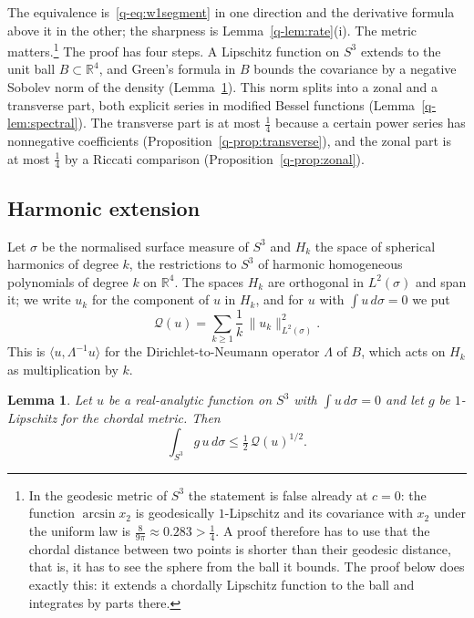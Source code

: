 \documentclass[11pt]{amsart}
\newtheorem{lemma}[theorem]{Lemma}
\theoremstyle{definition}
\theoremstyle{remark}
\numberwithin{equation}{section}
\newcommand{\R}{\mathbb{R}}
\newcommand{\ip}[2]{\langle #1,#2\rangle}
\begin{document}
The equivalence is~\eqref{q-eq:w1segment} in one direction and the derivative
formula above it in the other; the sharpness is Lemma~\ref{q-lem:rate}(i). The
metric matters.\footnote{In the geodesic metric of $S^3$ the statement is
false already at $c=0$: the function $\arcsin x_2$ is geodesically
$1$-Lipschitz and its covariance with $x_2$ under the uniform law is
$\frac8{9\pi}\approx0.283>\frac14$. A proof therefore has to use that the
chordal distance between two points is shorter than their geodesic distance,
that is, it has to see the sphere from the ball it bounds. The proof below
does exactly this: it extends a chordally Lipschitz function to the ball and
integrates by parts there.} The proof has four steps. A Lipschitz function
on $S^3$ extends to the unit ball $B\subset\R^4$, and Green's formula in $B$
bounds the covariance by a negative Sobolev norm of the density
(Lemma~\ref{q-lem:harmonic}). This norm splits into a zonal and a transverse
part, both explicit series in modified Bessel functions
(Lemma~\ref{q-lem:spectral}). The transverse part is at most $\frac14$ because a
certain power series has nonnegative coefficients
(Proposition~\ref{q-prop:transverse}), and the zonal part is at most $\frac14$
by a Riccati comparison (Proposition~\ref{q-prop:zonal}).

\subsection{Harmonic extension}

Let $\sigma$ be the normalised surface measure of $S^3$ and $H_k$ the space
of spherical harmonics of degree $k$, the restrictions to $S^3$ of harmonic
homogeneous polynomials of degree $k$ on $\R^4$. The spaces $H_k$ are
orthogonal in $L^2(\sigma)$ and span it; we write $u_k$ for the component of
$u$ in $H_k$, and for $u$ with $\int u\,d\sigma=0$ we put
\begin{equation}\label{q-eq:Qnorm}
\mathcal Q(u)=\sum_{k\ge1}\frac1k\,\|u_k\|_{L^2(\sigma)}^2 .
\end{equation}
This is $\ip u{\Lambda^{-1}u}$ for the Dirichlet-to-Neumann operator
$\Lambda$ of $B$, which acts on $H_k$ as multiplication by $k$.

\begin{lemma}\label{q-lem:harmonic}
Let $u$ be a real-analytic function on $S^3$ with $\int u\,d\sigma=0$ and let
$g$ be $1$-Lipschitz for the chordal metric. Then
\[
\int_{S^3}g\,u\,d\sigma\le\tfrac12\,\mathcal Q(u)^{1/2}.
\]
\end{lemma}
\end{document}
